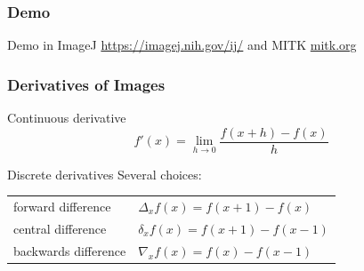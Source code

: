 \begin{frame}
    \frametitle{Demo}
    Demo in ImageJ \url{https://imagej.nih.gov/ij/} and MITK \url{mitk.org}
    \bigskip
\end{frame}


\begin{frame}
    \frametitle{Derivatives of Images}
    \begin{block}{Continuous derivative}
        \begin{equation*}
            f'(x) = \lim_{h\rightarrow0}\frac{f(x+h)-f(x)}{h}
        \end{equation*}
    \end{block}
    \begin{block}{Discrete derivatives}
        Several choices:

        \begin{center}
            \begin{tabularx}{0.8\textwidth}{lX}
                forward difference                    & $\Delta_x f(x) = f(x+1) - f(x)$   \\
                \rule{0pt}{1.5em}central difference   & $\delta_x f(x) = f(x+1) - f(x-1)$ \\
                \rule{0pt}{1.5em}backwards difference & $\nabla_x f(x) = f(x) - f(x-1)$
            \end{tabularx}
        \end{center}
    \end{block}
\end{frame}

